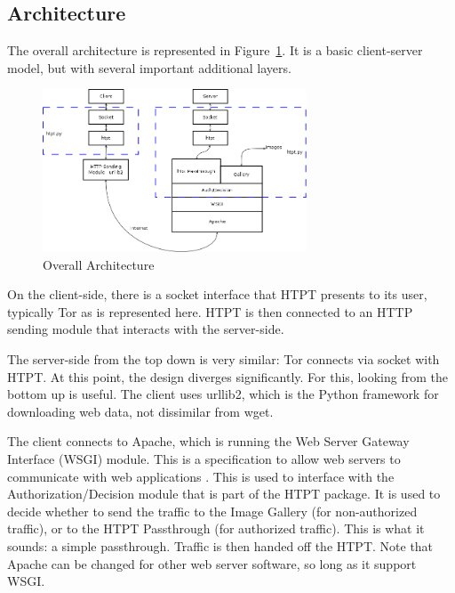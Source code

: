 \subsection{Architecture}
The overall architecture is represented in Figure~\ref{fig:overall_arch}. It is a basic client-server model, but with several important additional layers.

\begin{figure}[t]
\centering
\includegraphics[width=0.7\textwidth]{Overall_architecture}
\caption{Overall Architecture}
\label{fig:overall_arch}
\end{figure}

On the client-side, there is a socket interface that HTPT presents to its user, typically Tor as is represented here. HTPT is then connected to an HTTP sending module that interacts with the server-side.

The server-side from the top down is very similar: Tor connects via socket with HTPT. At this point, the design diverges significantly. For this, looking from the bottom up is useful. 
The client uses urllib2, which is the Python framework for downloading web data, not dissimilar from wget.

The client connects to Apache, which is running the Web Server Gateway Interface (WSGI) module. This is a specification to allow web servers to communicate with web applications \cite{Ref16}. This is used to interface with the Authorization/Decision module that is part of the HTPT package. It is used to decide whether to send the traffic to the Image Gallery (for non-authorized traffic), or to the HTPT Passthrough (for authorized traffic). This is what it sounds: a simple passthrough. Traffic is then handed off the HTPT.  Note that Apache can be changed for other web server software, so long as it support WSGI.

